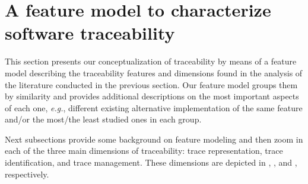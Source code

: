 \section{A feature model to characterize software traceability}\label{sec:fm}
This section presents our conceptualization of traceability by means of a feature model describing the traceability features and dimensions found in the analysis of the literature conducted in the previous section. Our feature model groups them by similarity and provides additional descriptions on the most important aspects of each one, \textit{e.g.}, different existing alternative implementation of the same feature and/or the most/the least studied ones in each group.  


Next subsections provide some background on feature modeling and then zoom in each of the three main dimensions of traceability: trace representation, trace identification, and trace management. These dimensions are depicted in , , and , respectively. %




